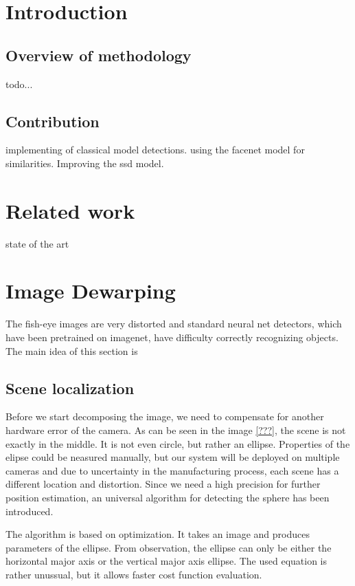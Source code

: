\documentclass[a4paper,12pt,titlepage, twoside]{article}
\numberwithin{figure}{section}
\begin{document}

\section{Introduction}
\subsection{Overview of methodology}
todo...
\subsection{Contribution}
implementing of classical model detections.
using the facenet model for similarities.
Improving the ssd model.


\section{Related work}
state of the art


\section{Image Dewarping}

The fish-eye images are very distorted and standard neural net detectors, which have been pretrained on imagenet, have difficulty correctly recognizing objects. The main idea of this section is 

\subsection{Scene localization}
\label{sec:scene_localization}
Before we start decomposing the image, we need to compensate for another hardware error of the camera. As can be seen in the image \ref{???}, the scene is not exactly in the middle. It is not even circle, but rather an ellipse. Properties of the elipse could be neasured manually, but our system will be deployed on multiple cameras and due to uncertainty in the manufacturing process, each scene has a different location and distortion. Since we need a high precision for further position estimation, an universal algorithm for detecting the sphere has been introduced.

The algorithm is based on optimization. It takes an image and produces parameters of the ellipse. From observation, the ellipse can only be either the horizontal major axis or the vertical major axis ellipse. The used equation is rather unussual, but it allows faster cost function evaluation.
\end{document}
